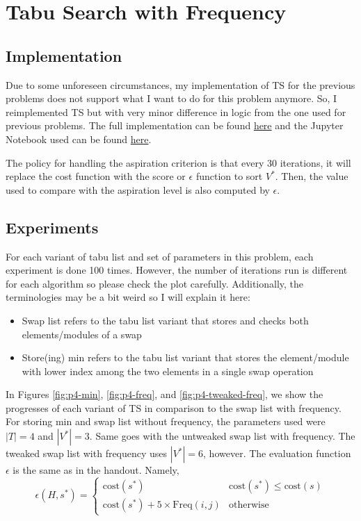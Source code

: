 \section{Tabu Search with Frequency}

\subsection{Implementation}

Due to some unforeseen circumstances, my implementation of TS for the previous problems does not support what I want to do for this problem anymore. So, I reimplemented TS but with very minor difference in logic from the one used for previous problems. The full implementation can be found \href{https://github.com/nngerncham/ma395_heuristic/blob/main/homework/hw3/codebase/tabu_search/p4.py}{here} and the Jupyter Notebook used can be found \href{https://github.com/nngerncham/ma395_heuristic/blob/main/homework/hw3/codebase/Notebooks/Problem\%204.ipynb}{here}.

The policy for handling the aspiration criterion is that every 30 iterations, it will replace the cost function with the score or \(\epsilon\) function to sort \(V^*\). Then, the value used to compare with the aspiration level is also computed by \(\epsilon\).

\subsection{Experiments}

For each variant of tabu list and set of parameters in this problem, each experiment is done 100 times. However, the number of iterations run is different for each algorithm so please check the plot carefully. Additionally, the terminologies may be a bit weird so I will explain it here:
\begin{itemize}
    \item Swap list refers to the tabu list variant that stores and checks both elements/modules of a swap
    \item Store(ing) min refers to the tabu list variant that stores the element/module with lower index among the two elements in a single swap operation
\end{itemize}

In Figures \ref{fig:p4-min}, \ref{fig:p4-freq}, and \ref{fig:p4-tweaked-freq}, we show the progresses of each variant of TS in comparison to the swap list with frequency. For storing min and swap list without frequency, the parameters used were \(|T| = 4\) and \(|V^*| = 3\). Same goes with the untweaked swap list with frequency. The tweaked swap list with frequency uses \(|V^*| = 6\), however. The evaluation function \(\epsilon\) is the same as in the handout. Namely,
\[
    \epsilon(H, s^*) = \begin{cases}
        \text{cost}(s^*) & \text{cost}(s^*) \leq \text{cost}(s) \\
        \text{cost}(s^*) + 5 \times \text{Freq}(i, j) & \text{otherwise}
    \end{cases}
\]

